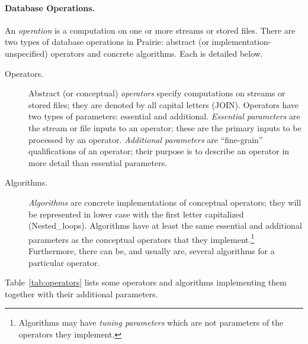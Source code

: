 \paragraph{Database Operations.}
An \emph{operation} is a computation on one or more streams or stored
files.  There are two types of database operations in Prairie:
abstract (or implementation-unspecified) operators and concrete
algorithms.  Each is detailed below.
\begin{description} %
\begin{description}
\item[Operators.]
Abstract (or conceptual) \emph{operators} specify computations on
streams or stored files; they are denoted by all capital
letters (\eg JOIN).  Operators have two types of parameters:
essential and additional.  \emph{Essential parameters} are the stream
or file inputs to an operator; these are the primary inputs to be
processed by an operator.   \emph{Additional parameters} are
``fine-grain'' qualifications of an operator; their purpose is to
describe an operator in more detail than essential parameters.

\item[Algorithms.]
\emph{Algorithms} are concrete implementations of conceptual operators;
they will be represented in lower case with the first letter
capitalized (\eg Nested\_loops).  Algorithms have at least the same
essential and additional parameters as the conceptual operators that
they implement.\footnote{Algorithms may have \emph{tuning parameters}
which are not parameters of the operators they implement.}
Furthermore, there can be, and usually are, several algorithms for a
particular operator.
\end{description}
\end{description}
Table~\ref{tab:operators} lists some operators and algorithms implementing
them together with their additional parameters.

